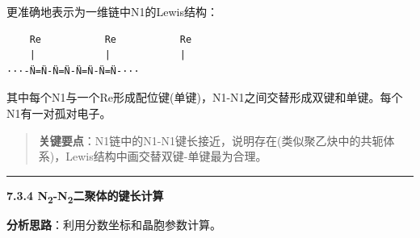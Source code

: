 更准确地表示为一维链中N1的Lewis结构：

\begin{verbatim}
    Re           Re           Re
    |            |            |
···-N̈=N̈-N̈=N̈-N̈=N̈-N̈=N̈-···
\end{verbatim}

其中每个N1与一个Re形成配位键(单键)，N1-N1之间交替形成双键和单键。每个N1有一对孤对电子。

\begin{quote}
\textbf{关键要点}：N1链中的N1-N1键长接近，说明存在(类似聚乙炔中的共轭体系)，Lewis结构中画交替双键-单键最为合理。
\end{quote}

\begin{center}\rule{0.5\linewidth}{0.5pt}\end{center}

\textbf{7.3.4 N\textsubscript{2}-N\textsubscript{2}二聚体的键长计算}

\textbf{分析思路}：利用分数坐标和晶胞参数计算。

